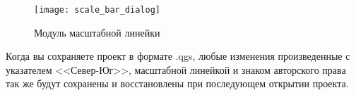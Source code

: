 \begin{figure}[ht]
   \centering
   \texttt{[image: scale\_bar\_dialog]}
   \caption{Модуль масштабной линейки \nixcaption}\label{fig:scale_bar}
\end{figure}

\begin{Tip}\caption{\textsc{Сохранение в проекте настроек модулей}}
Когда вы сохраняете проект в формате .qgs, любые изменения произведенные
с указателем <<Север-Юг>>, масштабной линейкой и знаком авторского права
так же будут сохранены и восстановлены при последующем открытии проекта.
\end{Tip}

\FloatBarrier
